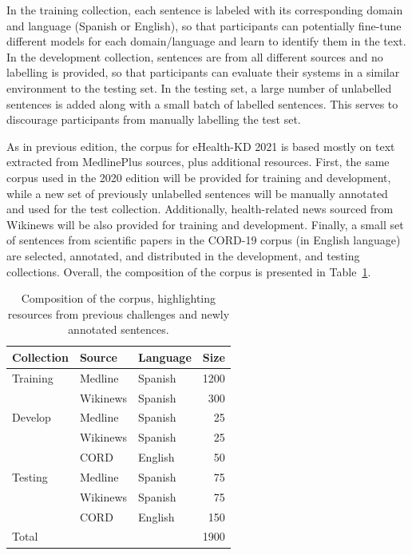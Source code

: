 \documentclass[a4paper,11pt,twocolumn,twoside]{article}
\begin{document}
In the training collection, each sentence is labeled with its corresponding domain and language (Spanish or English), so that participants can potentially fine-tune different models for each domain/language and learn to identify them in the text.
In the development collection, sentences are from all different sources and no labelling is provided, so that participants can evaluate their systems in a similar environment to the testing set.
In the testing set, a large number of unlabelled sentences is added along with a small batch of labelled sentences. This serves to discourage participants from manually labelling the test set.

As in previous edition, the corpus for eHealth-KD 2021 is based mostly on text extracted from MedlinePlus sources, plus additional resources.
First, the same corpus used in the 2020 edition will be provided for training and development, while a new set of previously unlabelled sentences will be manually annotated and used for the test collection. Additionally, health-related news sourced from Wikinews will be also provided for training and development.
Finally, a small set of sentences from scientific papers in the CORD-19 corpus (in English language) are selected, annotated, and distributed in the development, and testing collections. Overall, the composition of the corpus is presented in Table~\ref{tab:corpus}.

\begin{table}
  \begin{tabular}{lllr}
    \toprule
    Collection & Source & Language & Size \\
    \midrule
    Training & Medline & Spanish & 1200 \\
             & Wikinews & Spanish & 300 \\
    \midrule
    Develop & Medline & Spanish & 25 \\
            & Wikinews & Spanish & 25 \\
            & CORD & English & 50 \\
    \midrule
    Testing & Medline & Spanish & 75 \\
            & Wikinews & Spanish & 75 \\
            & CORD & English & 150 \\
    \midrule
    Total   &      &         & 1900 \\
    \bottomrule
  \end{tabular}
  \caption{Composition of the corpus, highlighting resources from previous
  challenges and newly annotated sentences.\label{tab:corpus}}
\end{table}
\end{document}
